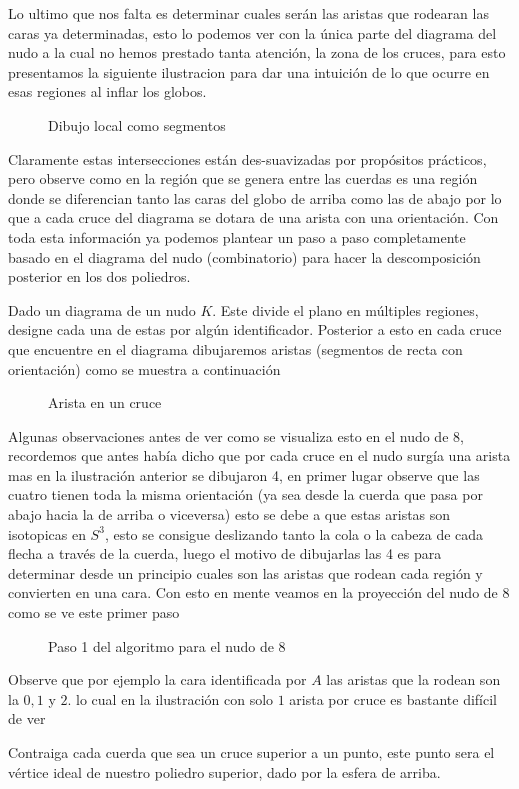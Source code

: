 Lo ultimo que nos falta es determinar cuales serán las aristas que rodearan las caras ya determinadas, esto lo podemos ver con la única parte del diagrama del nudo a la cual no hemos prestado tanta atención, la zona de los cruces, para esto presentamos la siguiente ilustracion para dar una intuición de lo que ocurre en esas regiones al inflar los globos.
\begin{figure}[H]
    \centering
    
    \caption{Dibujo local como segmentos}
\end{figure}
Claramente estas intersecciones están des-suavizadas por propósitos prácticos, pero observe como en la región que se genera entre las cuerdas es una región donde se diferencian tanto las caras del globo de arriba como las de abajo por lo que a cada cruce del diagrama se dotara de una arista con una orientación. Con toda esta información ya podemos plantear un paso a paso completamente basado en el diagrama del nudo (combinatorio) para hacer la descomposición posterior en los dos poliedros.

\begin{block}
Dado un diagrama de un nudo $K$. Este divide el plano en múltiples regiones, designe cada una de estas por algún identificador. Posterior a esto en cada cruce que encuentre en el diagrama dibujaremos aristas (segmentos de recta con orientación) como se muestra a continuación
\begin{figure}[H]
    \centering
    
    \caption{Arista en un cruce}
\end{figure}
\end{block}
Algunas observaciones antes de ver como se visualiza esto en el nudo de $8$, recordemos que antes había dicho que por cada cruce en el nudo surgía una arista mas en la ilustración anterior se dibujaron 4, en primer lugar observe que las cuatro tienen toda la misma orientación (ya sea desde la cuerda que pasa por abajo hacia la de arriba o viceversa) esto se debe a que estas aristas son isotopicas en $S^3$, esto se consigue deslizando tanto la cola o la cabeza de cada flecha a través de la cuerda, luego el motivo de dibujarlas las 4 es para determinar desde un principio cuales son las aristas que rodean cada región y convierten en una cara. Con esto en mente veamos en la proyección del nudo de $8$ como se ve este primer paso
\begin{figure}[H]



\caption{Paso 1 del algoritmo para el nudo de 8}

\end{figure}
Observe que por ejemplo la cara identificada por $A$ las aristas que la rodean son la $0,1$ y $2$. lo cual en la ilustración con solo $1$ arista por cruce es bastante difícil de ver
\begin{block}
    Contraiga cada cuerda que sea un cruce superior a un punto, este punto sera el vértice ideal de nuestro poliedro superior, dado por la esfera de arriba.
\end{block}

